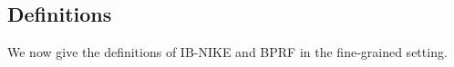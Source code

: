 
\subsection{Definitions}
We now give the definitions of IB-NIKE and BPRF in the fine-grained setting.

